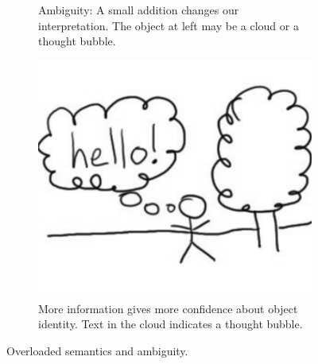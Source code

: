 \begin{figure}
\begin{subfigure}[b]{0.3\textwidth}
    \caption{Ambiguity: A small addition changes our
      interpretation. The object at left may be a cloud or a thought
      bubble.}
    \label{fig:cloud-2} 
  \end{subfigure}
  \hspace{0.03\linewidth}
  \begin{subfigure}[b]{0.3\textwidth}
    \centering
    \includegraphics[width=\textwidth]{img/cloud-3.pdf}  
    \caption{More information gives more confidence about object
      identity. Text in the cloud indicates a thought bubble.}
    \label{fig:cloud-3} 
  \end{subfigure}

  \caption[Overloaded semantics and ambiguity]{Overloaded semantics
    and ambiguity.}
  \label{fig:cloud}
\end{figure}
